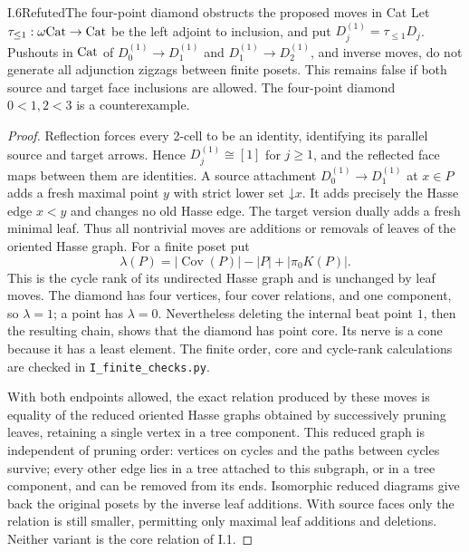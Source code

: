 \begin{claim}{I.6}{Refuted}{The four-point diamond obstructs the proposed moves in Cat}
Let $\tau_{\leq1}:\omega\mathrm{Cat}\to\mathrm{Cat}$ be the left adjoint to inclusion,
and put $D_j^{(1)}=\tau_{\leq1}D_j$. Pushouts in $\mathrm{Cat}$ of
$D_0^{(1)}\to D_1^{(1)}$ and $D_1^{(1)}\to D_2^{(1)}$, and inverse
moves, do not generate all adjunction zigzags between finite posets.
This remains false if both source and target face inclusions are
allowed. The four-point diamond $0<1,2<3$ is a counterexample.
\end{claim}
\begin{proof}
Reflection forces every 2-cell to be an identity, identifying its
parallel source and target arrows. Hence $D_j^{(1)}\cong[1]$ for
$j\geq1$, and the reflected face maps between them are identities.
A source attachment $D_0^{(1)}\to D_1^{(1)}$ at $x\in P$ adds a
fresh maximal point $y$ with strict lower set $\mathord\downarrow x$.
It adds precisely the Hasse edge $x<y$ and changes no old Hasse edge.
The target version dually adds a fresh minimal leaf. Thus all
nontrivial moves are additions or removals of leaves of the oriented
Hasse graph. For a finite poset put
\[
 \lambda(P)=|\operatorname{Cov}(P)|-|P|+|\pi_0K(P)|.
\]
This is the cycle rank of its undirected Hasse graph and is unchanged
by leaf moves. The diamond has four vertices, four cover relations,
and one component, so $\lambda=1$; a point has $\lambda=0$.
Nevertheless deleting the internal beat point $1$, then the resulting
chain, shows that the diamond has point core. Its nerve is a cone
because it has a least element. The finite order, core and cycle-rank
calculations are checked in \texttt{I\_finite\_checks.py}.

With both endpoints allowed, the exact relation produced by these
moves is equality of the reduced oriented Hasse graphs obtained by
successively pruning leaves, retaining a single vertex in a tree
component. This reduced graph is independent of pruning order:
vertices on cycles and the paths between cycles survive; every other
edge lies in a tree attached to this subgraph, or in a tree component,
and can be removed from its ends. Isomorphic reduced diagrams give
back the original posets by the inverse leaf additions. With source
faces only the relation is still smaller, permitting only maximal
leaf additions and deletions. Neither variant is the core relation
of I.1.
\end{proof}

